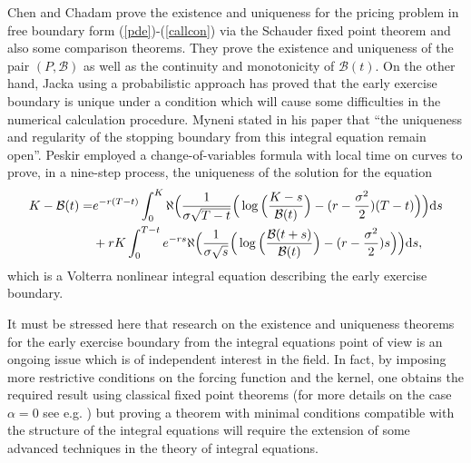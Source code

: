 \documentclass[fleqn,final,3p,11pt]{elsarticle}
\theoremstyle{definition}
\theoremstyle{remark}
\numberwithin{equation}{section}
\begin{document}
Chen and Chadam \cite{chen} prove the existence and uniqueness for the pricing problem in free boundary form (\ref{pde})-(\ref{callcon}) via the Schauder fixed point theorem and also some comparison theorems. They prove the existence and uniqueness of the pair $(P, \mathcal{B})$ as well as the continuity and monotonicity of $\mathcal{B}(t)$. On the other hand, Jacka \cite{jacka} using a probabilistic approach has proved that the early exercise boundary is unique under a condition which will cause some difficulties in the numerical calculation procedure. Myneni \cite{myneni} stated in his paper that ``the uniqueness and regularity of the stopping boundary from this integral equation remain open''. Peskir \cite{peskir} employed a change-of-variables formula with local time on curves to prove, in a nine-step process, the uniqueness of the solution for the equation
\begin{eqnarray*}\label{peskireq}
K-\mathcal{B}(t)=&e^{-r(T-t)}\int_{0}^{K}\aleph\Big(\dfrac{1}{\sigma
\sqrt{T-t}}\Big(\log\Big(\dfrac{K-s}{\mathcal{B}(t)}\Big)-(r-\frac{\sigma^{2}}{2})(T-t)\Big)\Big)\mathrm{d}s\\\notag
&+rK\int_{0}^{T-t}e^{-rs}\aleph\Big(\dfrac{1}{\sigma \sqrt{s}}\Big(\log\Big(\dfrac{\mathcal{B}(t+s)}{\mathcal{B}(t)}\Big)-(r-\dfrac{\sigma^{2}}{2})s\Big)\Big)\mathrm{d}s,
\end{eqnarray*}
which is a Volterra nonlinear integral equation describing the early exercise boundary.

It must be stressed here that research on the existence and uniqueness theorems for the early exercise boundary from the integral equations point of view is an ongoing issue which is of independent interest in the field. In fact, by imposing more restrictive conditions on the forcing function and the kernel, one obtains the required result using classical fixed point theorems (for more details on the case $\alpha =0$ see e.g. \cite{nedaiasl2017numerical}) but proving a theorem with minimal conditions compatible with the structure of the integral equations will require the extension of some advanced techniques in the theory of integral equations.
\end{document}
